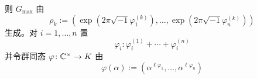 则 $G_{\max}$ 由
\begin{equation}
  \rho_k:=\left(\exp\left(2\pi\sqrt{-1}\varphi_1^{(k)}\right),\ldots,
  \exp\left(2\pi\sqrt{-1}\varphi_n^{(k)}\right)\right)
  \tag{15.9}
\end{equation}
生成。对 $i=1,\ldots,n$ 置
\begin{equation}
  \varphi_i\colon\varphi_i^{(1)}+\cdots+\varphi_i^{(n)}
  \tag{15.10}
\end{equation}
并令群同态 $\varphi\colon\mathbb{C}^\times\to K$ 由
\begin{equation}
  \varphi(\alpha):=\left(\alpha^{\ell\varphi_1},\ldots,\alpha^{\ell\varphi_n}\right)
  \tag{15.11}
\end{equation}

